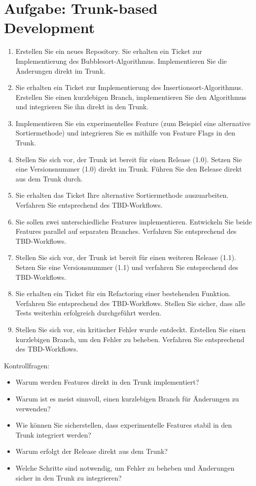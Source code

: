 
\section{Aufgabe: Trunk-based Development}
\label{sec:task:tbd}

\begin{enumerate}
    \item Erstellen Sie ein neues Repository. Sie erhalten ein Ticket zur Implementierung des Bubblesort\hyp Algorithmus. Implementieren Sie die Änderungen direkt im Trunk.
    \item Sie erhalten ein Ticket zur Implementierung des Insertionsort\hyp Algorithmus. Erstellen Sie einen kurzlebigen Branch, implementieren Sie den Algorithmus und integrieren Sie ihn direkt in den Trunk.
    \item Implementieren Sie ein experimentelles Feature (zum Beispiel eine alternative Sortiermethode) und integrieren Sie es mithilfe von Feature Flags in den Trunk.
    \item Stellen Sie sich vor, der Trunk ist bereit für einen Release (1.0).
    Setzen Sie eine Versionsnummer (1.0) direkt im Trunk.
    Führen Sie den Release direkt aus dem Trunk durch.
    \item Sie erhalten das Ticket Ihre alternative Sortiermethode auszuarbeiten. Verfahren Sie entsprechend des TBD-Workflows.
    \item Sie sollen zwei unterschiedliche Features implementieren. Entwickeln Sie beide Features parallel auf separaten Branches. Verfahren Sie entsprechend des TBD-Workflows.
    \item Stellen Sie sich vor, der Trunk ist bereit für einen weiteren Release (1.1).
    Setzen Sie eine Versionsnummer (1.1) und verfahren Sie entsprechend des TBD-Workflows.
    \item Sie erhalten ein Ticket für ein Refactoring einer bestehenden Funktion. Verfahren Sie entsprechend des TBD-Workflows. Stellen Sie sicher, dass alle Tests weiterhin erfolgreich durchgeführt werden.
    \item Stellen Sie sich vor, ein kritischer Fehler wurde entdeckt.
    Erstellen Sie einen kurzlebigen Branch, um den Fehler zu beheben. Verfahren Sie entsprechend des TBD-Workflows.
\end{enumerate}

Kontrollfragen:

\begin{itemize}
    \item Warum werden Features direkt in den Trunk implementiert?
    \item Warum ist es meist sinnvoll, einen kurzlebigen Branch für Änderungen zu verwenden?
    \item Wie können Sie sicherstellen, dass experimentelle Features stabil in den Trunk integriert werden?
    \item  Warum erfolgt der Release direkt aus dem Trunk?
    \item Welche Schritte sind notwendig, um Fehler zu beheben und Änderungen sicher in den Trunk zu integrieren?
\end{itemize}